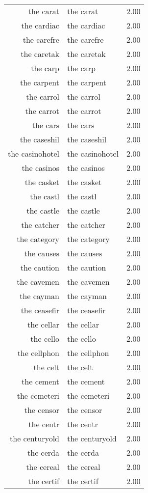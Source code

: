 \begin{table}[ht]
\begin{tabular}{rlr}
  the carat & the carat & 2.00 \\ 
  the cardiac & the cardiac & 2.00 \\ 
  the carefre & the carefre & 2.00 \\ 
  the caretak & the caretak & 2.00 \\ 
  the carp & the carp & 2.00 \\ 
  the carpent & the carpent & 2.00 \\ 
  the carrol & the carrol & 2.00 \\ 
  the carrot & the carrot & 2.00 \\ 
  the cars & the cars & 2.00 \\ 
  the caseshil & the caseshil & 2.00 \\ 
  the casinohotel & the casinohotel & 2.00 \\ 
  the casinos & the casinos & 2.00 \\ 
  the casket & the casket & 2.00 \\ 
  the castl & the castl & 2.00 \\ 
  the castle & the castle & 2.00 \\ 
  the catcher & the catcher & 2.00 \\ 
  the category & the category & 2.00 \\ 
  the causes & the causes & 2.00 \\ 
  the caution & the caution & 2.00 \\ 
  the cavemen & the cavemen & 2.00 \\ 
  the cayman & the cayman & 2.00 \\ 
  the ceasefir & the ceasefir & 2.00 \\ 
  the cellar & the cellar & 2.00 \\ 
  the cello & the cello & 2.00 \\ 
  the cellphon & the cellphon & 2.00 \\ 
  the celt & the celt & 2.00 \\ 
  the cement & the cement & 2.00 \\ 
  the cemeteri & the cemeteri & 2.00 \\ 
  the censor & the censor & 2.00 \\ 
  the centr & the centr & 2.00 \\ 
  the centuryold & the centuryold & 2.00 \\ 
  the cerda & the cerda & 2.00 \\ 
  the cereal & the cereal & 2.00 \\ 
  the certif & the certif & 2.00 \\ 

\end{tabular}
\end{table}
